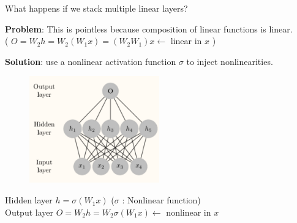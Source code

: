 \documentclass{report}
\begin{document}
\begin{concept}
    What happens if we stack multiple linear layers?

    \textbf{Problem}: This is pointless because composition of linear functions is linear.\\
    ( $O = W_2 h = W_2(W_1 x) = (W_2 W_1) x \leftarrow$ linear in $x$ )

    \textbf{Solution}: use a nonlinear activation function $\sigma$ to inject nonlinearities.

    \begin{figure}[H]
        \centering
        \includegraphics[width=0.5\textwidth]{.././assets/4.2.png}
    \end{figure}

    Hidden layer $h=\sigma(W_1 x)$ ($\sigma$ : Nonlinear function)\\
    Output layer $O=W_2 h = W_2 \sigma(W_1 x) \leftarrow$ nonlinear in $x$
\end{concept}
\end{document}
